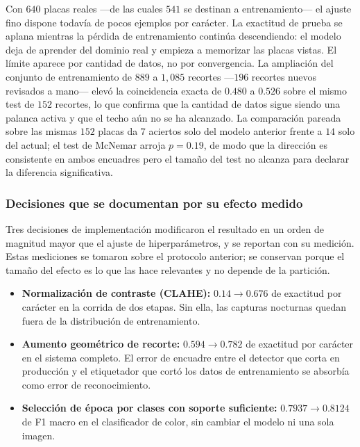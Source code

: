 Con $640$ placas reales ---de las cuales $541$ se destinan a entrenamiento--- el
ajuste fino dispone todavía de pocos ejemplos por carácter. La exactitud de prueba
se aplana mientras la pérdida de entrenamiento continúa descendiendo: el modelo
deja de aprender del dominio real y empieza a memorizar las placas vistas. El
límite aparece por cantidad de datos, no por convergencia. La ampliación del
conjunto de entrenamiento de $889$ a $1{,}085$ recortes ---$196$ recortes nuevos
revisados a mano--- elevó la coincidencia exacta de $0{.}480$ a $0{.}526$ sobre
el mismo test de $152$ recortes, lo que confirma que la cantidad de datos sigue
siendo una palanca activa y que el techo aún no se ha alcanzado. La comparación
pareada sobre las mismas $152$ placas da $7$ aciertos solo del modelo anterior
frente a $14$ solo del actual; el test de McNemar
\cite{mcnemar1947note,dietterich1998approximate} arroja $p = 0{.}19$, de modo que
la dirección es consistente en ambos encuadres pero el tamaño del test no alcanza
para declarar la diferencia significativa.

\subsubsection{Decisiones que se documentan por su efecto medido}

Tres decisiones de implementación modificaron el resultado en un orden de magnitud
mayor que el ajuste de hiperparámetros, y se reportan con su medición. Estas
mediciones se tomaron sobre el protocolo anterior; se conservan porque el tamaño
del efecto es lo que las hace relevantes y no depende de la partición.

\begin{itemize}
    \item \textbf{Normalización de contraste (CLAHE):} $0{.}14 \rightarrow 0{.}676$
        de exactitud por carácter en la corrida de dos etapas. Sin ella, las
        capturas nocturnas quedan fuera de la distribución de entrenamiento.
    \item \textbf{Aumento geométrico de recorte:} $0{.}594 \rightarrow 0{.}782$ de
        exactitud por carácter en el sistema completo. El error de encuadre entre
        el detector que corta en producción y el etiquetador que cortó los datos
        de entrenamiento se absorbía como error de reconocimiento.
    \item \textbf{Selección de época por clases con soporte suficiente:}
        $0{.}7937 \rightarrow 0{.}8124$ de F1 macro en el clasificador de color,
        sin cambiar el modelo ni una sola imagen.
\end{itemize}


